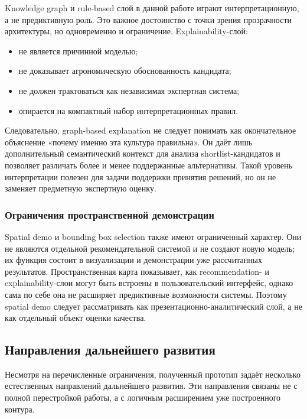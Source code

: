 Knowledge graph и rule-based слой в данной работе играют интерпретационную, а не предиктивную роль. Это важное
достоинство с точки зрения прозрачности архитектуры, но одновременно и ограничение. Explainability-слой:

\begin{itemize}
\tightlist
\item
  не является причинной моделью;
\item
  не доказывает агрономическую обоснованность кандидата;
\item
  не должен трактоваться как независимая экспертная система;
\item
  опирается на компактный набор интерпретационных правил.
\end{itemize}

Следовательно, graph-based explanation не следует понимать как окончательное объяснение «почему именно эта культура
правильна». Он даёт лишь дополнительный семантический контекст для анализа shortlist-кандидатов и позволяет различать
более и менее поддержанные альтернативы. Такой уровень интерпретации полезен для задачи поддержки принятия решений, но
он не заменяет предметную экспертную оценку.

\subsubsection{Ограничения пространственной демонстрации}

Spatial demo и bounding box selection также имеют ограниченный характер. Они не являются отдельной рекомендательной
системой и не создают новую модель; их функция состоит в визуализации и демонстрации уже рассчитанных результатов.
Пространственная карта показывает, как recommendation- и explainability-слои могут быть встроены в пользовательский
интерфейс, однако сама по себе она не расширяет предиктивные возможности системы. Поэтому spatial demo следует
рассматривать как презентационно-аналитический слой, а не как отдельный объект оценки качества.

\subsection{Направления дальнейшего развития}

Несмотря на перечисленные ограничения, полученный прототип задаёт несколько естественных направлений дальнейшего
развития. Эти направления связаны не с полной перестройкой работы, а с логичным расширением уже построенного контура.

